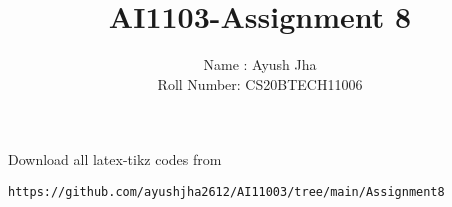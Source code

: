 \documentclass[journal,12pt,twocolumn]{IEEEtran}
\DeclareMathOperator*{\Res}{Res}
\begin{document}
\newcommand{\Int}{\int\limits}
\newcommand{\BEQA}{\begin{eqnarray}}
\newcommand{\EEQA}{\end{eqnarray}}
\newcommand{\define}{\stackrel{\triangle}{=}}

\raggedbottom
\setlength{\parindent}{0pt}
\providecommand{\mbf}{\mathbf}
\providecommand{\pr}[1]{\ensuremath{\Pr\left(#1\right)}}
\providecommand{\qfunc}[1]{\ensuremath{Q\left(#1\right)}}
\providecommand{\sbrak}[1]{\ensuremath{{}\left[#1\right]}}
\providecommand{\lsbrak}[1]{\ensuremath{{}\left[#1\right.}}
\providecommand{\rsbrak}[1]{\ensuremath{{}\left.#1\right]}}
\providecommand{\brak}[1]{\ensuremath{\left(#1\right)}}
\providecommand{\lbrak}[1]{\ensuremath{\left(#1\right.}}
\providecommand{\rbrak}[1]{\ensuremath{\left.#1\right)}}
\providecommand{\cbrak}[1]{\ensuremath{\left\{#1\right\}}}
\providecommand{\lcbrak}[1]{\ensuremath{\left\{#1\right.}}
\providecommand{\rcbrak}[1]{\ensuremath{\left.#1\right\}}}
\theoremstyle{remark}
\newtheorem{rem}{Remark}
\newcommand{\sgn}{\mathop{\mathrm{sgn}}}
\providecommand{\abs}[1]{\vert#1\vert}
\providecommand{\res}[1]{\Res\displaylimits_{#1}} 
\providecommand{\norm}[1]{\lVert#1\rVert}
\providecommand{\mtx}[1]{\mathbf{#1}}
\providecommand{\mean}[1]{E[ #1 ]}
\providecommand{\fourier}{\overset{\mathcal{F}}{ \rightleftharpoons}}
\providecommand{\system}{\overset{\mathcal{H}}{ \longleftrightarrow}}
\newcommand{\solution}{\noindent \textbf{Solution: }}
\newcommand{\cosec}{\,\text{cosec}\,}
\providecommand{\dec}[2]{\ensuremath{\overset{#1}{\underset{#2}{\gtrless}}}}
\newcommand{\myvec}[1]{\ensuremath{\begin{pmatrix}#1\end{pmatrix}}}
\newcommand{\mydet}[1]{\ensuremath{\begin{vmatrix}#1\end{vmatrix}}}
\makeatletter
{}
\makeatother
\let\StandardTheFigure\thefigure
\let\vec\mathbf
\renewcommand{\thefigure}{\theproblem}
\def\putbox#1#2#3{\makebox[0in][l]{\makebox[#1][l]{}\raisebox{\baselineskip}[0in][0in]{\raisebox{#2}[0in][0in]{#3}}}}
     \def\rightbox#1{\makebox[0in][r]{#1}}
     \def\centbox#1{\makebox[0in]{#1}}
     \def\topbox#1{\raisebox{-\baselineskip}[0in][0in]{#1}}
     \def\midbox#1{\raisebox{-0.5\baselineskip}[0in][0in]{#1}}
\vspace{3cm}
\title{AI1103-Assignment 8}
\author{Name : Ayush Jha \\ Roll Number: CS20BTECH11006}
\maketitle
\newpage
\bigskip
\renewcommand{\thefigure}{\theenumi}
\renewcommand{\thetable}{\theenumi}
Download all latex-tikz codes from 
%
\begin{lstlisting}
https://github.com/ayushjha2612/AI11003/tree/main/Assignment8
\end{lstlisting}
\end{document}
